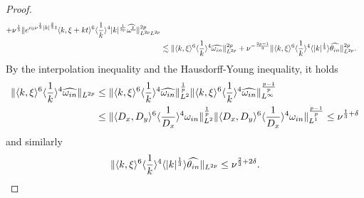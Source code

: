 \documentclass[10pt,a4paper]{amsart}
\begin{document}
\begin{proof}
\begin{equation}
\begin{aligned}
				+ \nu^\frac13 \| e^{ c_0 \nu^\frac13 |k|^\frac23 t}    \langle k, \xi + kt\rangle^6 \langle \frac{1}{k}\rangle^4 |k|^\frac{1}{3p} \widehat{\omega^{\mathrm{L}}} \|_{L^{2p} L^{2p}}^{2p} \\
				&\lesssim \|  \langle k, \xi\rangle^6 \langle \frac{1}{k}\rangle^4  \widehat{\omega_{\rm in}} \|_{L^{2p}}^{2p}  + \nu^{-\frac{2p-1}{3}} \|  \langle k, \xi\rangle^6 \langle \frac{1}{k}\rangle^4 \langle |k|^\frac13 \rangle \widehat{\theta_{\rm in}} \|_{L^{2p}}^{2p}.
		\end{aligned}\end{equation}
		By the interpolation inequality and the Hausdorff-Young inequality, it holds 
		\begin{equation}\begin{aligned} \label{eq:ini omega}
				\|  \langle k, \xi\rangle^6 \langle \frac{1}{k}\rangle^4  \widehat{\omega_{\rm in}} \|_{L^{2p}} &\leq  \|  \langle k, \xi\rangle^6 \langle \frac{1}{k}\rangle^4  \widehat{\omega_{\rm in}} \|_{L^{2}}^\frac1p \|  \langle k, \xi\rangle^6 \langle \frac{1}{k}\rangle^4  \widehat{\omega_{\rm in}} \|_{L^{\infty}}^\frac{p-1}{p} \\
				& \leq  \|  \langle D_x, D_y\rangle^6 \langle \frac{1}{D_x}\rangle^4 \omega_{\rm in} \|_{L^2}^\frac1p \|  \langle D_x, D_y\rangle^6 \langle \frac{1}{D_x}\rangle^4 \omega_{\rm in} \|_{L^1}^\frac{p-1}{p} \leq \nu^{\frac13 + \delta}
		\end{aligned}\end{equation}
		and similarly
		\begin{equation}\begin{aligned} \label{eq:ini theta}
				\|  \langle k, \xi\rangle^6 \langle \frac{1}{k}\rangle^4 \langle |k|^\frac13 \rangle  \widehat{\theta_{\rm in}} \|_{L^{2p}} \leq \nu^{\frac23 + 2\delta}.
		\end{aligned}\end{equation}

\end{proof}
\end{document}
